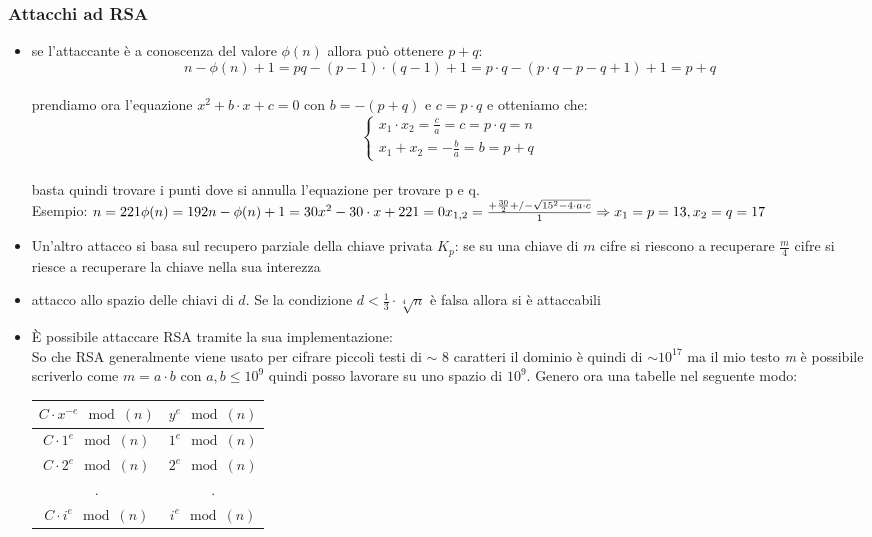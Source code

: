 \documentclass[10pt,a4paper]{article}
\begin{document}
\subsubsection{Attacchi ad RSA}
\begin{itemize}
\item se l'attaccante è a conoscenza del valore $\phi(n)$ allora può ottenere $p+q$:
$$n- \phi(n)+1 = pq-(p-1)\cdot(q-1)+1 = p\cdot q - (p\cdot q-p-q+1)+1 = p+q$$\\
prendiamo ora l'equazione $x^2+b\cdot x + c = 0$ con $b=-(p+q)$ e $c=p\cdot q$ e otteniamo che:\\
$$\begin{cases}
x_1\cdot x_2 = \frac{c}{a} = c = p\cdot q = n\\
x_1+x_2 = -\frac{b}{a} = b = p+q
\end{cases}$$\\
basta quindi trovare i punti dove si annulla l'equazione per trovare p e q.\\
Esempio:
$n=221 \phi(n)=192 \\ n-\phi(n)+1=30 \\ x^2-30\cdot x + 221 = 0 \\ x_{1,2}=\frac{+\frac{30}{2}+/- \sqrt{15^2-4\cdot a \cdot c} }{1} \Rightarrow x_1=p=13,x_2=q=17$
\item Un'altro attacco si basa sul recupero parziale della chiave privata $K_p$: se su una chiave di $m$ cifre si riescono a recuperare $\frac{m}{4}$ cifre si riesce a recuperare la chiave nella sua interezza
\item attacco allo spazio delle chiavi di $d$. Se la condizione $d<\frac{1}{3}\cdot\sqrt[4]{n}$ è falsa allora si è attaccabili
\item È possibile attaccare RSA tramite la sua implementazione:\\
So che RSA generalmente viene usato per cifrare piccoli testi di $\sim$ 8 caratteri il dominio è quindi di $\sim 10^17$ ma il mio testo \textit{m} è possibile scriverlo come $m=a\cdot b$ con $a,b\le 10^9$ quindi posso lavorare su uno spazio di $10^9$. Genero ora una tabelle nel seguente modo:
\begin{center}
\begin{tabular}{c|c}
$C\cdot x^{-e} \mod(n)$& 	$y^e \mod(n)$ \\
\hline
$C\cdot 1^e \mod(n)$& 	$1^e \mod(n)$ \\
$C\cdot 2^e \mod(n)$& 	$2^e \mod(n)$ \\
.&.\\
$C\cdot i^e \mod(n)$& 	$i^e \mod(n)$  \\

\end{tabular}
\end{center}
\end{itemize}
\end{document}
